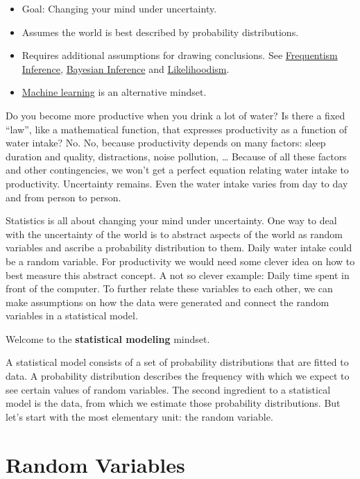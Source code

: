 \documentclass[
  10pt,
]{scrbook}
\providecommand{\tightlist}{%
  \setlength{\itemsep}{0pt}\setlength{\parskip}{0pt}}
\begin{document}
\begin{itemize}
\tightlist
\item
  Goal: Changing your mind under uncertainty.
\item
  Assumes the world is best described by probability distributions.
\item
  Requires additional assumptions for drawing conclusions. See \protect\hyperlink{frequentist-inference}{Frequentism Inference}, \protect\hyperlink{bayesian-inference}{Bayesian Inference} and \protect\hyperlink{likelihoodism}{Likelihoodism}.
\item
  \protect\hyperlink{machine-learning}{Machine learning} is an alternative mindset.
\end{itemize}

Do you become more productive when you drink a lot of water?
Is there a fixed ``law'', like a mathematical function, that expresses productivity as a function of water intake?
No.
No, because productivity depends on many factors: sleep duration and quality, distractions, noise pollution, \ldots{}
Because of all these factors and other contingencies, we won't get a perfect equation relating water intake to productivity.
Uncertainty remains.
Even the water intake varies from day to day and from person to person.

Statistics is all about changing your mind under uncertainty.
One way to deal with the uncertainty of the world is to abstract aspects of the world as random variables and ascribe a probability distribution to them.
Daily water intake could be a random variable.
For productivity we would need some clever idea on how to best measure this abstract concept.
A not so clever example: Daily time spent in front of the computer.
To further relate these variables to each other, we can make assumptions on how the data were generated and connect the random variables in a statistical model.

Welcome to the \textbf{statistical modeling} mindset.

A statistical model consists of a set of probability distributions that are fitted to data.
A probability distribution describes the frequency with which we expect to see certain values of random variables.
The second ingredient to a statistical model is the data, from which we estimate those probability distributions.
But let's start with the most elementary unit: the random variable.

\hypertarget{random-variables}{%
\section{Random Variables}\label{random-variables}}
\end{document}
